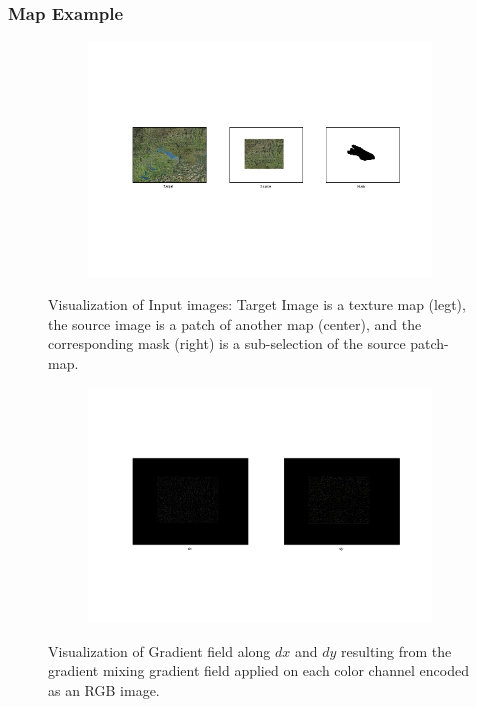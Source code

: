 \documentclass{paper}
\begin{document}
\subsubsection{Map Example}
\begin{figure}[H]
    \centering
    \begin{subfigure}{1.0\textwidth}
        \includegraphics[width=\textwidth]{../../outputs/p4/seamless_cloning/map/input}
    \end{subfigure}
    \caption{Visualization of Input images: Target Image is a texture map (legt), the source image is a patch of another map (center), and the corresponding mask (right)  is a sub-selection of the source patch-map.}
    \label{fig:seamless_cloning_map_input}       
\end{figure}


\begin{figure}[H]
    \centering
    \begin{subfigure}{1.0\textwidth}
        \includegraphics[width=\textwidth]{../../outputs/p4/seamless_cloning/map/gradients}
    \end{subfigure}
    \caption{Visualization of Gradient field along $dx$ and $dy$ resulting from the gradient mixing gradient field applied on each color channel encoded as an RGB image.}
    \label{fig:seamless_cloning_map_gradients}       
\end{figure}
\end{document}
